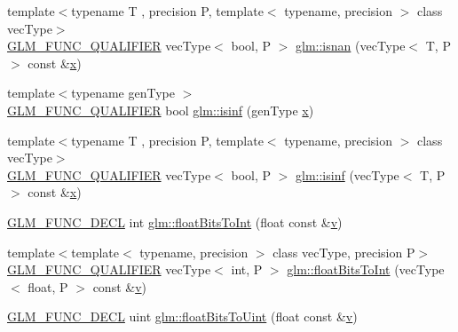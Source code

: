 \begin{DoxyCompactItemize}
\item 
{\footnotesize template$<$typename T , precision P, template$<$ typename, precision $>$ class vec\+Type$>$ }\\\mbox{\hyperlink{setup_8hpp_a33fdea6f91c5f834105f7415e2a64407}{G\+L\+M\+\_\+\+F\+U\+N\+C\+\_\+\+Q\+U\+A\+L\+I\+F\+I\+ER}} vec\+Type$<$ bool, P $>$ \mbox{\hyperlink{group__core__func__common_ga6cb8f202a52eed2331724a3800198ebf}{glm\+::isnan}} (vec\+Type$<$ T, P $>$ const \&\mbox{\hyperlink{glad_8h_a92d0386e5c19fb81ea88c9f99644ab1d}{x}})
\item 
{\footnotesize template$<$typename gen\+Type $>$ }\\\mbox{\hyperlink{setup_8hpp_a33fdea6f91c5f834105f7415e2a64407}{G\+L\+M\+\_\+\+F\+U\+N\+C\+\_\+\+Q\+U\+A\+L\+I\+F\+I\+ER}} bool \mbox{\hyperlink{namespaceglm_a2c0ee7d7e149b7ddf60abb7b73845330}{glm\+::isinf}} (gen\+Type \mbox{\hyperlink{glad_8h_a92d0386e5c19fb81ea88c9f99644ab1d}{x}})
\item 
{\footnotesize template$<$typename T , precision P, template$<$ typename, precision $>$ class vec\+Type$>$ }\\\mbox{\hyperlink{setup_8hpp_a33fdea6f91c5f834105f7415e2a64407}{G\+L\+M\+\_\+\+F\+U\+N\+C\+\_\+\+Q\+U\+A\+L\+I\+F\+I\+ER}} vec\+Type$<$ bool, P $>$ \mbox{\hyperlink{group__core__func__common_gaf28f7a4696746f081685c9fd05c7e2de}{glm\+::isinf}} (vec\+Type$<$ T, P $>$ const \&\mbox{\hyperlink{glad_8h_a92d0386e5c19fb81ea88c9f99644ab1d}{x}})
\item 
\mbox{\hyperlink{setup_8hpp_ab2d052de21a70539923e9bcbf6e83a51}{G\+L\+M\+\_\+\+F\+U\+N\+C\+\_\+\+D\+E\+CL}} int \mbox{\hyperlink{group__core__func__common_gadc6a536a7bef046c3293d2ccad6d9ca2}{glm\+::float\+Bits\+To\+Int}} (float const \&\mbox{\hyperlink{glad_8h_a14cfbe2fc2234f5504618905b69d1e06}{v}})
\item 
{\footnotesize template$<$template$<$ typename, precision $>$ class vec\+Type, precision P$>$ }\\\mbox{\hyperlink{setup_8hpp_a33fdea6f91c5f834105f7415e2a64407}{G\+L\+M\+\_\+\+F\+U\+N\+C\+\_\+\+Q\+U\+A\+L\+I\+F\+I\+ER}} vec\+Type$<$ int, P $>$ \mbox{\hyperlink{group__core__func__common_gac4a0710238ae54c67931dd29a0b0f873}{glm\+::float\+Bits\+To\+Int}} (vec\+Type$<$ float, P $>$ const \&\mbox{\hyperlink{glad_8h_a14cfbe2fc2234f5504618905b69d1e06}{v}})
\item 
\mbox{\hyperlink{setup_8hpp_ab2d052de21a70539923e9bcbf6e83a51}{G\+L\+M\+\_\+\+F\+U\+N\+C\+\_\+\+D\+E\+CL}} uint \mbox{\hyperlink{group__core__func__common_ga748b4d2819b48d28ca09dc8733488873}{glm\+::float\+Bits\+To\+Uint}} (float const \&\mbox{\hyperlink{glad_8h_a14cfbe2fc2234f5504618905b69d1e06}{v}})

\end{DoxyCompactItemize}
